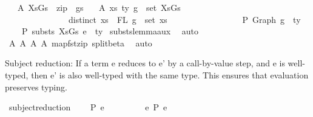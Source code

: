 \begin{isabellebody}
\ \ \ A{}{\isacharcolon}{\kern0pt}\ {\isachardoublequoteopen}XsGs\ {\isacharequal}{\kern0pt}\ zip\ {\isasymGamma}\ gs{\isachardoublequoteclose}\isanewline
\ \ \ A{}{\isacharcolon}{\kern0pt}\ {\isachardoublequoteopen}{\isasymforall}{\isacharparenleft}{\kern0pt}{\isacharparenleft}{\kern0pt}xs{\isacharcomma}{\kern0pt}\ ty{\isacharparenright}{\kern0pt}{\isacharcomma}{\kern0pt}\ g{\isacharparenright}{\kern0pt}\ {\isasymin}\ set\ XsGs{\isachardot}{\kern0pt}\ {\isacharparenleft}{\kern0pt}\isanewline
\ \ \ \ \ \ \ \ \ \ \ \ \ \ \ distinct\ xs\ {\isasymand}\ FL\ g\ {\isacharequal}{\kern0pt}\ set\ xs\ {\isasymand}\isanewline
\ \ \ \ \ \ \ \ \ \ \ \ \ \ \ {\isacharbrackleft}{\kern0pt}{\isacharbrackright}{\kern0pt}\ {\isasymturnstile}{\isacharbraceleft}{\kern0pt}P{\isacharbraceright}{\kern0pt}\ {\isacharparenleft}{\kern0pt}Graph\ g{\isacharparenright}{\kern0pt}\ {\isacharcolon}{\kern0pt}\ ty{\isacharparenright}{\kern0pt}{\isachardoublequoteclose}\isanewline
\ \ \ {\isachardoublequoteopen}{\isasymGamma}{}\ {\isasymturnstile}{\isacharbraceleft}{\kern0pt}P{\isacharbraceright}{\kern0pt}\ substs\ XsGs\ e{}\ {\isacharcolon}{\kern0pt}\ ty{}{\isachardoublequoteclose}\isanewline
%
\isadelimproof
%
\endisadelimproof
%
\isatagproof
{}\isamarkupfalse%
\ substs{\isacharunderscore}{\kern0pt}lemma{\isacharunderscore}{\kern0pt}aux\ \isamarkupfalse%
\ auto\isanewline
{}\isamarkupfalse%
\ A{}\ A{}\ A{}\ A{}\ map{\isacharunderscore}{\kern0pt}fst{\isacharunderscore}{\kern0pt}zip\ split{\isacharunderscore}{\kern0pt}beta\ \isamarkupfalse%
\ auto%
\endisatagproof
{\isafoldproof}%
%
\isadelimproof
%
\endisadelimproof
%
\begin{isamarkuptext}%
Subject reduction:
  If a term e reduces to e' by a call-by-value step,
  and e is well-typed,
  then e' is also well-typed with the same type.
  This ensures that evaluation preserves typing.%
\end{isamarkuptext}\isamarkuptrue%
\isamarkupfalse%
\ subject{\isacharunderscore}{\kern0pt}reduction{\isacharcolon}{\kern0pt}\isanewline
\ \ \ {\isachardoublequoteopen}{\isasymGamma}\ {\isasymturnstile}{\isacharbraceleft}{\kern0pt}P{\isacharbraceright}{\kern0pt}\ e\ {\isacharcolon}{\kern0pt}\ {\isasymtau}{\isachardoublequoteclose}\isanewline
\ \ \ \ \ \ \ {\isachardoublequoteopen}e\ {\isacharminus}{\kern0pt}{\isachargreater}{\kern0pt}{\isacharbraceleft}{\kern0pt}P{\isacharbraceright}{\kern0pt}\ e{\isacharprime}{\kern0pt}{\isachardoublequoteclose}\isanewline

\end{isabellebody}

